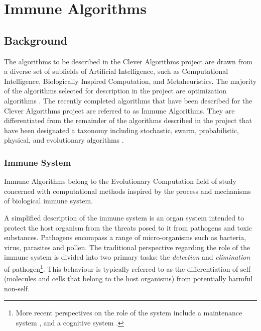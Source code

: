 \documentclass[a4paper, 11pt]{article}
\begin{document}
% 
% 
\section{Immune Algorithms}
\label{sec:algorithms}

% 
% 
\subsection{Background}
The algorithms to be described in the Clever Algorithms project are drawn from a diverse set of subfields of Artificial Intelligence, such as Computational Intelligence, Biologically Inspired Computation, and Metaheuristics. The majority of the algorithms selected for description in the project are optimization algorithms \cite{Brownlee2010b}. 
The recently completed algorithms that have been described for the Clever Algorithms project are referred to as Immune Algorithms. They are differentiated from the remainder of the algorithms described in the project that have been designated a taxonomy including stochastic, swarm, probabilistic, physical, and evolutionary algorithms \cite{Brownlee2010b}. 

\subsubsection{Immune System}
Immune Algorithms belong to the Evolutionary Computation field of study concerned with computational methods inspired by the process and mechanisms of biological immune system. 

A simplified description of the immune system is an organ system intended to protect the host organism from the threats posed to it from pathogens and toxic substances. Pathogens encompass a range of micro-organisms such as bacteria, virus, parasites and pollen. The traditional perspective regarding the role of the immune system is divided into two primary tasks: the \emph{detection} and \emph{elimination} of pathogen\footnote{More recent perspectives on the role of the system include a maintenance system \cite{Cohen2001a}, and a cognitive system \cite{Varela1994}.}. This behaviour is typically referred to as the differentiation of self (molecules and cells that belong to the host organisms) from potentially harmful non-self. 
\end{document}
